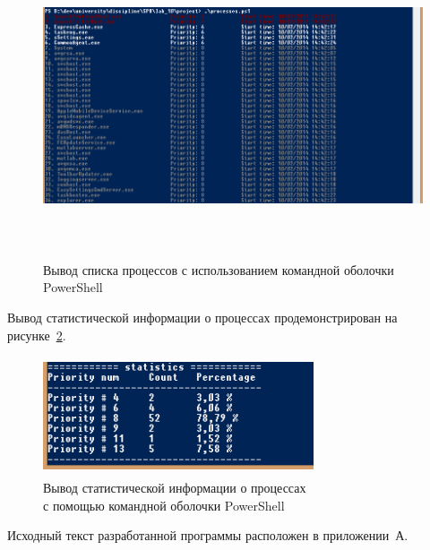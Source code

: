 \begin{figure}[htbp]
  \centering
  \includegraphics[width=150mm,height=90mm]{img/process}
  \caption{Вывод списка процессов с использованием командной оболочки PowerShell}\label{fig:process}
\end{figure}

Вывод статистической информации о процессах продемонстрирован на рисунке~\ref{fig:statistics}.

\begin{figure}[htbp]
  \centering
  \includegraphics[width=80mm,height=35mm]{img/statistics}
  \caption{Вывод статистической информации о процессах \\ с помощью командной оболочки PowerShell}\label{fig:statistics}
\end{figure}

Исходный текст разработанной программы расположен в приложении~А.

\newpage
